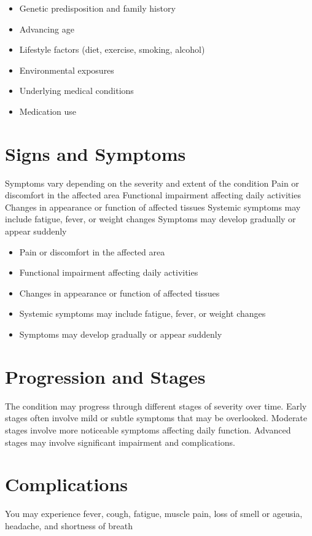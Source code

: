 \begin{itemize}[noitemsep]
  \item Genetic predisposition and family history
  \item Advancing age
  \item Lifestyle factors (diet, exercise, smoking, alcohol)
  \item Environmental exposures
  \item Underlying medical conditions
  \item Medication use
\end{itemize}
\section{Signs and Symptoms}
Symptoms vary depending on the severity and extent of the condition Pain or discomfort in the affected area Functional impairment affecting daily activities Changes in appearance or function of affected tissues Systemic symptoms may include fatigue, fever, or weight changes Symptoms may develop gradually or appear suddenly

\begin{itemize}[noitemsep]
  \item Pain or discomfort in the affected area
  \item Functional impairment affecting daily activities
  \item Changes in appearance or function of affected tissues
  \item Systemic symptoms may include fatigue, fever, or weight changes
  \item Symptoms may develop gradually or appear suddenly
\end{itemize}
\section{Progression and Stages}
The condition may progress through different stages of severity over time. Early stages often involve mild or subtle symptoms that may be overlooked. Moderate stages involve more noticeable symptoms affecting daily function. Advanced stages may involve significant impairment and complications.
\section{Complications}
You may experience fever, cough, fatigue, muscle pain, loss of smell or ageusia, headache, and shortness of breath

